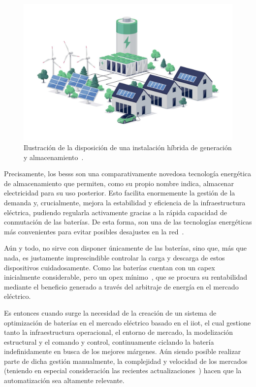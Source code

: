 \begin{figure}
  \centering
  \includegraphics[width=0.5\linewidth]{figures/instalacion-bess.jpg}
  \caption[Ilustración de la disposición de una instalación híbrida.]{Ilustración de la disposición de una instalación híbrida de generación y almacenamiento~\cite{deutz2023what}.}%
  \label{fig:instalacion-bess}
\end{figure}

Precisamente, los \glspl{bess} son una comparativamente novedosa tecnología energética de almacenamiento que permiten, como su propio nombre indica, almacenar electricidad para su uso posterior. Esto facilita enormemente la gestión de la demanda y, crucialmente, mejora la estabilidad y eficiencia de la infraestructura eléctrica, pudiendo regularla activamente gracias a la rápida capacidad de conmutación de las baterías. De esta forma, son una de las tecnologías energéticas más convenientes para evitar posibles desajustes en la red~\cite{xu2014bess}.

Aún y todo, no sirve con disponer únicamente de las baterías, sino que, más que nada, es justamente imprescindible controlar la carga y descarga de estos dispositivos cuidadosamente. Como las baterías cuentan con un \gls{capex} inicialmente considerable, pero un \gls{opex} mínimo~\cite{larsson2018cost}, que se procura su rentabilidad mediante el beneficio generado a través del arbitraje de energía en el mercado eléctrico.

Es entonces cuando surge la necesidad de la creación de un sistema de optimización de baterías en el mercado eléctrico basado en el \gls{iiot}, el cual gestione tanto la infraestructura operacional, el entorno de mercado, la modelización estructural y el comando y control, continuamente ciclando la batería indefinidamente en busca de los mejores márgenes. Aún siendo posible realizar parte de dicha gestión manualmente, la complejidad y velocidad de los mercados (teniendo en especial consideración las recientes actualizaciones~\cite{cnmc2025resolucion, omie2025instruccion}) hacen que la automatización sea altamente relevante.

